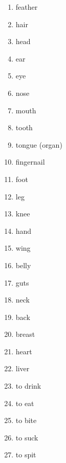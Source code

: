 \begin{multicols}{2}
\begin{enumerate}
\item   feather 

\item   hair 

\item   head 

\item   ear 

\item   eye 

\item   nose 

\item   mouth 

\item   tooth 

\item   tongue (organ) 

\item   fingernail 

\item   foot 

\item   leg 

\item   knee 

\item   hand 

\item   wing 

\item   belly 

\item   guts 

\item   neck 

\item   back 

\item   breast 

\item   heart 

\item   liver 

\item   to drink 

\item   to eat 

\item   to bite 

\item   to suck 

\item   to spit 


\end{enumerate}
\end{multicols}
